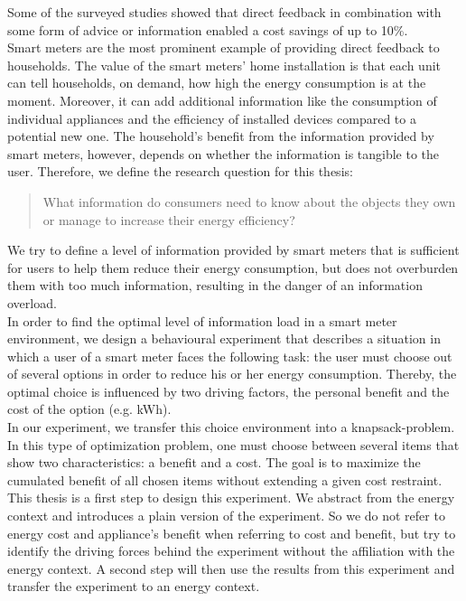 Some of the surveyed studies showed that direct feedback in combination with some form of advice or information enabled a cost savings of up to 10\%.\\
Smart meters are the most prominent example of providing direct feedback to households. The value of the smart meters' home installation is that each unit can tell households, on demand, how high the energy consumption is at the moment. Moreover, it can add additional information like the consumption of individual appliances and the efficiency of installed devices compared to a potential new one. The household's benefit from the information provided by smart meters, however, depends on whether the information is tangible to the user.
Therefore, we define the research question for this thesis:
\begin{quotation}
What information do consumers need to know about the objects they own or manage to increase their energy efficiency? 
\end{quotation}
We try to define a level of information provided by smart meters that is sufficient for users to help them reduce their energy consumption, but does not overburden them with too much information, resulting in the danger of an information overload.\\
In order to find the optimal level of information load in a smart meter environment, we design a behavioural experiment that describes a situation in which a user of a smart meter faces the following task: the user must choose out of several options in order to reduce his or her energy consumption. Thereby, the optimal choice is influenced by two driving factors, the personal benefit and the cost of the option (e.g. kWh).\\
In our experiment, we transfer this choice environment into a knapsack-problem. In this type of optimization problem, one must choose between several items that show two characteristics: a benefit and a cost. The goal is to maximize the cumulated benefit of all chosen items without extending a given cost restraint.\\ 
This thesis is a first step to design this experiment. We abstract from the energy context and introduces a plain version of the experiment. So we do not refer to energy cost and appliance's benefit when referring to cost and benefit, but try to identify the driving forces behind the experiment without the affiliation with the energy context. A second step will then use the results from this experiment and transfer the experiment to an energy context.\\ 
